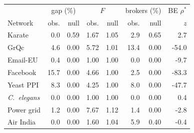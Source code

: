 \setlength{\tabcolsep}{2.5pt}\footnotesize
\begin{tabular}{l rr rr rr r}
\toprule
 & \multicolumn{2}{c}{gap (\%)} & \multicolumn{2}{c}{$F$} & \multicolumn{2}{c}{brokers (\%)} & BE $\rho^*$\\
Network & obs. & null & obs. & null & obs. & null & $z$\\
\midrule
Karate & 0.0 & 0.59 & 1.67 & 1.05 & 2.9 & 0.65 & 2.7\\
GrQc & 4.6 & 0.00 & 5.72 & 1.01 & 13.4 & 0.00 & -54.0\\
Email-EU & 0.4 & 0.00 & 1.00 & 1.00 & 0.0 & 0.00 & -9.7\\
Facebook & 15.7 & 0.00 & 4.66 & 1.00 & 2.5 & 0.00 & -83.3\\
\midrule
Yeast PPI & 8.3 & 0.00 & 4.25 & 1.00 & 8.0 & 0.00 & -47.7\\
\emph{C.~elegans} & 0.0 & 0.00 & 1.00 & 1.00 & 0.0 & 0.00 & 0.4\\
\midrule
Power grid & 1.2 & 0.00 & 7.67 & 1.12 & 1.4 & 0.00 & -2.8\\
Air India & 0.0 & 0.00 & 1.60 & 1.04 & 5.9 & 0.40 & -0.4\\
\bottomrule
\end{tabular}